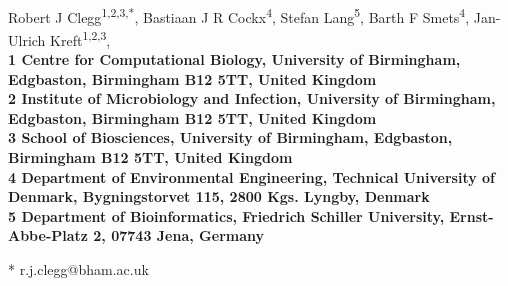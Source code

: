 \documentclass[10pt,letterpaper]{article}
\date{}
\begin{document}
\vspace*{0.35in}

\begin{flushleft}
{\Large
\textbf{}
}
\newline
\\
Robert J Clegg\textsuperscript{1,2,3,*},
Bastiaan J R Cockx\textsuperscript{4},
Stefan Lang\textsuperscript{5},
Barth F Smets\textsuperscript{4},
Jan-Ulrich Kreft\textsuperscript{1,2,3},
\\
\bigskip
\bf{1} Centre for Computational Biology, University of Birmingham, Edgbaston, Birmingham B12 5TT, United Kingdom
\\
\bf{2} Institute of Microbiology and Infection, University of Birmingham, Edgbaston, Birmingham B12 5TT, United Kingdom
\\
\bf{3} School of Biosciences, University of Birmingham, Edgbaston, Birmingham B12 5TT, United Kingdom
\\
\bf{4} Department of Environmental Engineering, Technical University of Denmark, Bygningstorvet 115, 2800 Kgs. Lyngby, Denmark 
\\
\bf{5} Department of Bioinformatics, Friedrich Schiller University, Ernst-Abbe-Platz 2, 07743 Jena, Germany 
\\
\bigskip

% 
%





* r.j.clegg@bham.ac.uk

\end{flushleft}
\end{document}
